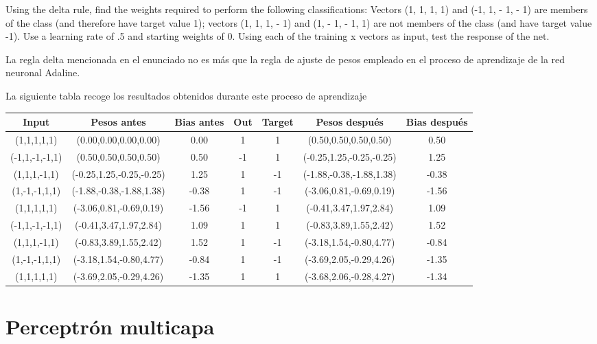 \begin{problem}[19]
Using the delta rule, find the weights required to perform the following classifications:
Vectors (1, 1, 1, 1) and (-1, 1, - 1, - 1) are members of the class (and therefore
have target value 1); vectors (1, 1, 1, - 1) and (1, - 1, - 1, 1) are not members of
the class (and have target value -1). Use a learning rate of .5 and starting weights
of 0. Using each of the training x vectors as input, test the response of the net.
\solution

La regla delta mencionada en el enunciado no es más que la regla de ajuste de pesos empleado en el proceso de aprendizaje de la red neuronal Adaline.

La siguiente tabla recoge los resultados obtenidos durante este proceso de aprendizaje
\small
\begin{center}
\begin{tabular}{|c|c|c|c|c|c|c|}
\hline
\textbf{Input} & \textbf{Pesos antes} &  \textbf{Bias antes} & \textbf{Out} & \textbf{Target} & \textbf{Pesos después} & \textbf{Bias después} \\
\hline
(1,1,1,1,1) & (0.00,0.00,0.00,0.00) & 0.00 & 1 & 1 & (0.50,0.50,0.50,0.50) & 0.50\\
(-1,1,-1,-1,1) & (0.50,0.50,0.50,0.50) & 0.50 & -1 & 1 & (-0.25,1.25,-0.25,-0.25) & 1.25\\
(1,1,1,-1,1) & (-0.25,1.25,-0.25,-0.25) & 1.25 & 1 & -1 & (-1.88,-0.38,-1.88,1.38) & -0.38\\
(1,-1,-1,1,1) & (-1.88,-0.38,-1.88,1.38) & -0.38 & 1 & -1 & (-3.06,0.81,-0.69,0.19) & -1.56\\
(1,1,1,1,1) & (-3.06,0.81,-0.69,0.19) & -1.56 & -1 & 1 & (-0.41,3.47,1.97,2.84) & 1.09\\
(-1,1,-1,-1,1) & (-0.41,3.47,1.97,2.84) & 1.09 & 1 & 1 & (-0.83,3.89,1.55,2.42) & 1.52\\
(1,1,1,-1,1) & (-0.83,3.89,1.55,2.42) & 1.52 & 1 & -1 & (-3.18,1.54,-0.80,4.77) & -0.84\\
(1,-1,-1,1,1) & (-3.18,1.54,-0.80,4.77) & -0.84 & 1 & -1 & (-3.69,2.05,-0.29,4.26) & -1.35\\
(1,1,1,1,1) & (-3.69,2.05,-0.29,4.26) & -1.35 & 1 & 1 & (-3.68,2.06,-0.28,4.27) & -1.34\\
\hline
\end{tabular}
\end{center}
\normalsize
\end{problem}

\section{Perceptrón multicapa}

